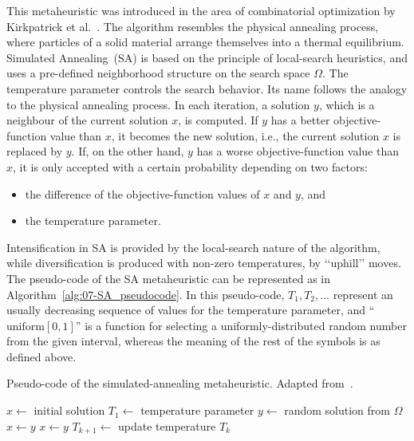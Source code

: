 This metaheuristic was introduced in the area of combinatorial optimization
by Kirkpatrick et al.~\cite{Kirkpatrick_OptimizationBySimulatesAnnealing}.
The algorithm resembles the physical annealing process, where particles
of a solid material arrange themselves into a thermal equilibrium.
Simulated Annealing~(SA)
is based on the principle of local-search heuristics, and uses a pre-defined
neighborhood structure on the search space $\Omega$. The temperature
parameter controls the search behavior. Its name follows the analogy
to the physical annealing process. In each iteration, a solution $y$,
which is a neighbour of the current solution $x$, is computed. If
$y$ has a better objective-function value than $x$, it becomes the
new solution, i.e., the current solution $x$ is replaced by $y$.
If, on the other hand, $y$ has a worse objective-function value than
$x$, it is only accepted with a certain probability depending on
two factors: 
\begin{itemize}
\item the difference of the objective-function values of $x$ and $y$,
and
\item the temperature parameter. 
\end{itemize}
Intensification in SA is provided by the local-search nature of the
algorithm, while diversification is produced with non-zero temperatures,
by \textquoteleft{}\textquoteleft{}uphill\textquoteright{}\textquoteright{}
moves. The pseudo-code of the SA metaheuristic can be represented
as in Algorithm~\ref{alg:07-SA_pseudocode}. In this pseudo-code,
$T_{1},T_{2},...$ represent an usually decreasing sequence of values
for the temperature parameter, and ``$\mathrm{{uniform}[0,1]}$''
is a function for selecting a uniformly-distributed random number
from the given interval, whereas the meaning of the rest of the symbols
is as defined above. 

\begin{algorithm}
\centering

\caption{Pseudo-code of the simulated-annealing metaheuristic. Adapted from~\cite{Bianchi-A_survey_on_metaheuristics_for_stachastic_combinatorial_optimization:2009}.\textit{\label{alg:07-SA_pseudocode}}}


\begin{algorithmic}
\Require $x \gets$ initial solution
\Require $T_{\mathrm{1}} \gets$ temperature parameter
	\State $y \gets$ random solution from $\Omega$
		\State $x \gets y$
		\State $x \gets y$
	\EndIf
	\State $T_{k+1} \gets$ update temperature $T_{k}$
\EndFor
\end{algorithmic}
\end{algorithm}


